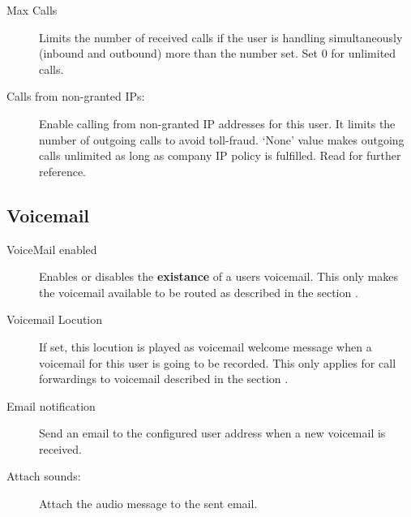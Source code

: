 \documentclass[letterpaper,10pt,english]{sphinxmanual}
\begin{document}
\begin{description}
\item[{Max Calls}] \leavevmode{}\label{pbx_features/users:term-max-calls}
Limits the number of received calls if the user is handling
simultaneously (inbound and outbound) more than the number set.
Set 0 for unlimited calls.

\item[{Calls from non-granted IPs:}] \leavevmode{}\label{pbx_features/users:term-calls-from-non-granted-ips}
Enable calling from non-granted IP addresses for this user.
It limits the number of outgoing calls to avoid toll-fraud.
`None' value makes outgoing calls unlimited as long as company IP
policy is fulfilled. Read {\hyperref[security/index:roadwarrior\string-users]{}} for further reference.

\end{description}


\subsection{Voicemail}
\label{pbx_features/users:voicemail}
\noindent{}
\begin{description}
\item[{VoiceMail enabled}] \leavevmode{}\label{pbx_features/users:term-voicemail-enabled}
Enables or disables the \textbf{existance} of a users voicemail.
This only makes the voicemail available to be routed as described in the
section {\hyperref[pbx_features/users:fwd\string-to\string-vm]{}}.

\item[{Voicemail Locution}] \leavevmode{}\label{pbx_features/users:term-voicemail-locution}
If set, this locution is played as voicemail welcome message when a voicemail
for this user is going to be recorded. This only applies for call forwardings
to voicemail described in the section {\hyperref[pbx_features/users:fwd\string-to\string-vm]{}}.

\item[{Email notification}] \leavevmode{}\label{pbx_features/users:term-email-notification}
Send an email to the configured user address when a new voicemail is
received.

\item[{Attach sounds:}] \leavevmode{}\label{pbx_features/users:term-attach-sounds}
Attach the audio message to the sent email.

\end{description}
\end{document}
